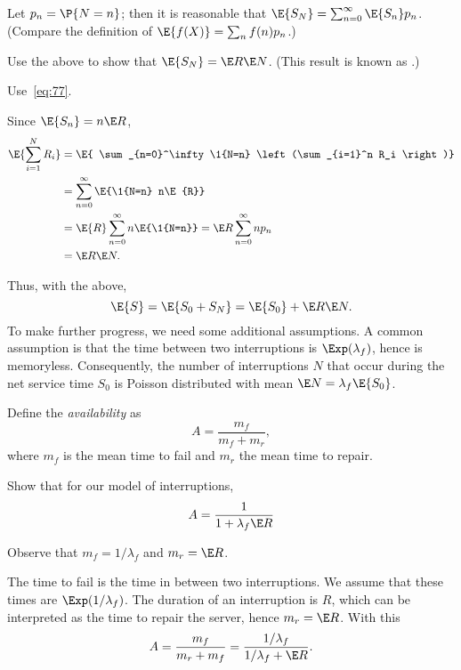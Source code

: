 Let $p_n=\P{N=n}$; then it is reasonable that $\E{S_N}=\sum_{n=0}^\infty \E{S_n}p_n$. (Compare the definition of $\E{f(X)}=\sum_{n} f(n) p_n$.)

\begin{exercise}[\faCalculator]\label{ex:16}
Use the above to show that $\E{S_N}=\E R \E N$. (This result is known as .)
\begin{hint}
  Use~\eqref{eq:77}. 
\end{hint}
\begin{solution}
Since $\E{S_n} = n \E R$, 
\begin{align*}
  \E{\sum_{i=1}^N R_i} 
&=  \E{ \sum_{n=0}^\infty \1{N=n} \left(\sum_{i=1}^n R_i \right)} \\
&=  \sum_{n=0}^\infty \E{\1{N=n} n\E{R}} \\
&=  \E{R} \sum_{n=0}^\infty n \E{\1{N=n}} = \E R \sum_{n=0}^\infty n p_n\\
&= \E R \E N.
\end{align*}
\end{solution}
\end{exercise}

Thus, with the above, 
\begin{equation*}
  \E{S} = \E{S_0 + S_N} = \E{S_0} + \E R \E N.
\end{equation*}
To make further progress, we need some additional assumptions.
A common assumption is that the time between two interruptions is $\Exp(\lambda_f)$, hence is memoryless.
Consequently, the number of interruptions $N$ that occur during the net service time $S_0$ is  Poisson distributed with mean $\E N = \lambda_f \E{S_0}$.


Define the \emph{availability} as
\begin{equation*}
  A=\frac{m_f}{m_f + m_r},
\end{equation*}
where $m_f$ is the mean time to fail and $m_r$ the mean time to repair. 
\begin{exercise}[\faFlask]
  Show that  for our model of interruptions,
  \begin{equation*}
A=\frac 1{1+\lambda_f \E R}
  \end{equation*}
  \begin{hint}
    Observe that $m_f = 1/\lambda_f$ and $m_r = \E R$.
  \end{hint}
  \begin{solution}
The time to fail is the time in between two interruptions. We assume that these times are $\Exp(1/\lambda_f)$. The duration of an interruption is $R$, which can be interpreted as the time to repair the server, hence $m_r = \E R$. With this
\begin{equation*}
  A=\frac{m_f}{m_r + m_f}=\frac{1/\lambda_f }{1/\lambda_f + \E R}. 
\end{equation*}
  \end{solution}
\end{exercise}


